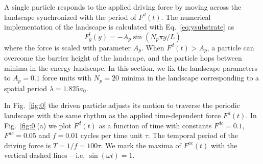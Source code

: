 \documentclass[twocolumn,preprintnumbers,amsmath,amssymb,aps,prx]{revtex4}
\begin{document}
A single particle %
responds to the applied driving force
by moving across the landscape %
synchronized with 
the period of $F^d(t)$.
%
The numerical implementation of the landscape 
is calculated with Eq.~\ref{eq:ysubstrate} as 
\begin{equation}
  \label{eq:force}
  F^l_y(y) = -A_{p} \sin{(N_p \pi y / L)} 
\end{equation}
where the force is scaled with parameter $A_{p}$.
When $F^d(t) > A_p$, a particle can 
overcome the barrier height of the landscape,
and 
the particle hops between minima in the energy landscape.
In this section, we fix the landscape parameters
to $A_{p} = 0.1$ force units
with $N_p=20$ minima in the landscape
corresponding to a spatial period $\lambda = 1.825 a_0$.

In Fig.~\ref{fig:0} 
the driven particle adjusts
its motion to traverse
the periodic landscape with the same rhythm as 
the applied time-dependent force $F^d(t)$.
%
In Fig.~\ref{fig:0}(a)
we plot $F^d(t)$ %
as a function of time with
constants $F^{dc}=0.1$, 
$F^{ac}=0.05$ and $f=0.01$ cycles per time unit $\tau$.
The temporal period of the driving force is
$T = 1/f = 100 \tau$.
We mark the maxima of $F^{ac}(t)$
with the
vertical dashed lines %
-- i.e. $\sin{(\omega t)} = 1$.


\end{document}
